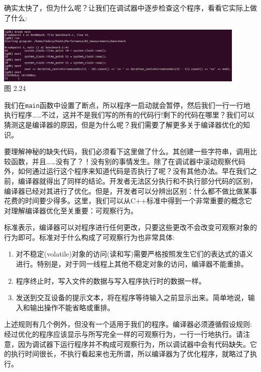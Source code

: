 确实太快了，但为什么呢？让我们在调试器中逐步检查这个程序，看看它实际上做了什么:

\begin{center}
\includegraphics[width=0.9\textwidth]{content/1/chapter2/images/24.jpg}\\
图 2.24
\end{center}

我们在\texttt{main}函数中设置了断点，所以程序一启动就会暂停，然后我们一行一行地执行程序……不过，这并不是我们写的所有的代码行!剩下的代码在哪里？我们可以猜测这是编译器的原因，但是为什么呢？我们需要了解更多关于编译器优化的知识。


要理解神秘的缺失代码，我们必须看下这里做了什么。其创建一些字符串，调用比较函数，并且……没有了？！没有别的事情发生。除了在调试器中滚动观察代码外，如何通过运行这个程序来知道代码是否执行了呢？没有其他办法。早在我们之前，编译器就得出了同样的结论。开发者无法区分执行和不执行部分代码的区别，编译器已经对其进行了优化。但是，开发者可以分辨出区别：什么都不做比做某事花费的时间要少得多。这里，我们可以从C++标准中得到一个非常重要的概念它对理解编译器优化至关重要：可观察行为。

标准表示，编译器可以对程序进行任何更改，只要这些更改不会改变可观察对象的行为即可。标准对于什么构成了可观察行为也非常具体:

\begin{enumerate}
\item 对不稳定(volatile)对象的访问(读和写)需要严格按照发生它们的表达式的语义进行。特别是，对于同一线程上其他不稳定对象的访问，编译器不能重排。

\item 程序终止时，写入文件的数据与写入程序执行时的数据一样。

\item 发送到交互设备的提示文本，将在程序等待输入之前显示出来。简单地说，输入和输出操作不能省略或重排。
\end{enumerate}

上述规则有几个例外，但没有一个适用于我们的程序。编译器必须遵循假设规则:经过优化的程序应该显示与所写完全一样的可观察行为，一行一行地执行。请注意，因为调试器下运行程序并不构成可观察行为，所以调试器中会有代码缺失。它的执行时间很长，不执行看起来也无所谓，所以编译器为了优化程序，就略过了执行。

